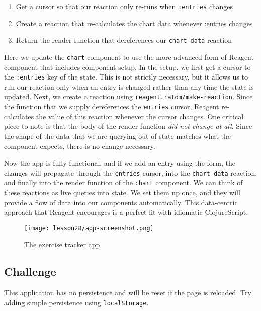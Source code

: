 \documentclass[10pt,twoside,openright]{memoir}
\begin{document}
\begin{enumerate}
\def\labelenumi{\arabic{enumi}.}
\tightlist
\item
  Get a cursor so that our reaction only re-runs when \texttt{:entries}
  changes
\item
  Create a reaction that re-calculates the chart data whenever :entries
  changes
\item
  Return the render function that dereferences our \texttt{chart-data}
  reaction
\end{enumerate}

Here we update the \texttt{chart} component to use the more advanced
form of Reagent component that includes component setup. In the setup,
we first get a cursor to the \texttt{:entries} key of the state. This is
not strictly necessary, but it allows us to run our reaction only when
an entry is changed rather than any time the state is updated. Next, we
create a reaction using \texttt{reagent.ratom/make-reaction}. Since the
function that we supply dereferences the \texttt{entries} cursor,
Reagent re-calculates the value of this reaction whenever the cursor
changes. One critical piece to note is that the body of the render
function \emph{did not change at all}. Since the shape of the data that
we are querying out of state matches what the component expects, there
is no change necessary.

Now the app is fully functional, and if we add an entry using the form,
the changes will propagate through the \texttt{entries} cursor, into the
\texttt{chart-data} reaction, and finally into the render function of
the \texttt{chart} component. We can think of these reactions as live
queries into state. We set them up once, and they will provide a flow of
data into our components automatically. This data-centric approach that
Reagent encourages is a perfect fit with idiomatic ClojureScript.

\begin{figure}[H]
\caption{The exercise tracker app}
\centering
\texttt{[image: lesson28/app-screenshot.png]}
\end{figure}


\subsection{Challenge}

This application has no persistence and will be reset if the page is
reloaded. Try adding simple persistence using \texttt{localStorage}.
\end{document}
